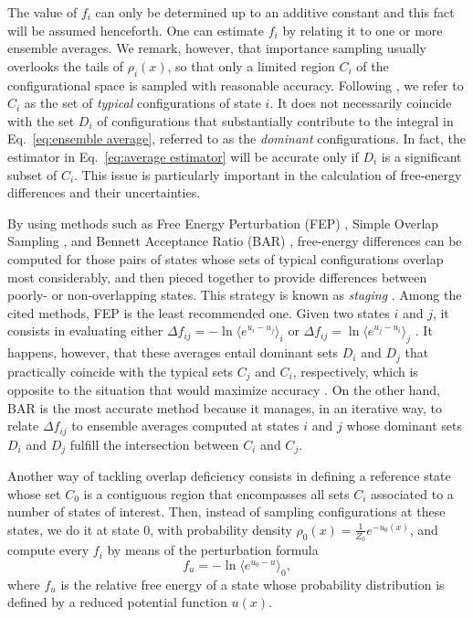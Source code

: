 \documentclass[journal=jctcce,manuscript=article,layout=twocolumn]{achemso}
\begin{document}
The value of $f_i$ can only be determined up to an additive constant and this fact will be assumed henceforth. One can estimate $f_i$ by relating it to one or more ensemble averages. We remark, however, that importance sampling usually overlooks the tails of $\rho_i(x)$, so that only a limited region $C_i$ of the configurational space is sampled with reasonable accuracy. Following \citeauthor{Jarzynski_2006} \cite{Jarzynski_2006}, we refer to $C_i$ as the set of \textit{typical} configurations of state $i$. It does not necessarily coincide with the set $D_i$ of configurations that substantially contribute to the integral in Eq.~\eqref{eq:ensemble average}, referred to as the \textit{dominant} configurations. In fact, the estimator in Eq.~\eqref{eq:average estimator} will be accurate only if $D_i$ is a significant subset of $C_i$. This issue is particularly important in the calculation of free-energy differences and their uncertainties.

By using methods such as Free Energy Perturbation (FEP) \cite{Zwanzig_1954}, Simple Overlap Sampling \cite{Lee_1980, Lu_2003}, and Bennett Acceptance Ratio (BAR) \cite{Bennett_1976}, free-energy differences can be computed for those pairs of states whose sets of typical configurations overlap most considerably, and then pieced together to provide differences between poorly- or non-overlapping states. This strategy is known as \textit{staging} \cite{Kofke_1998}. Among the cited methods, FEP is the least recommended one. Given two states $i$ and $j$, it consists in evaluating either $\Delta f_{ij} = -\ln \langle e^{u_i - u_j} \rangle_i$ or $\Delta f_{ij} = \ln \langle e^{u_j - u_i} \rangle_j$ \cite{Zwanzig_1954}. It happens, however, that these averages entail dominant sets $D_i$ and $D_j$ that practically coincide with the typical sets $C_j$ and $C_i$, respectively, which is opposite to the situation that would maximize accuracy \cite{Jarzynski_2006}. On the other hand, BAR is the most accurate method because it manages, in an iterative way, to relate $\Delta f_{ij}$ to ensemble averages computed at states $i$ and $j$ whose dominant sets $D_i$ and $D_j$ fulfill the intersection between $C_i$ and $C_j$.

Another way of tackling overlap deficiency consists in defining a reference state whose set $C_0$ is a contiguous region that encompasses all sets $C_i$ associated to a number of states of interest. Then, instead of sampling configurations at these states, we do it at state $0$, with probability density $\rho_0(x) = \frac{1}{Z_0} e^{-u_0(x)}$, and compute every $f_i$ by means of the perturbation formula
\begin{equation}
\label{eq:nbs sampling free energy}
f_u = -\ln \langle e^{u_0-u} \rangle_0,
\end{equation}
where $f_u$ is the relative free energy of a state whose probability distribution is defined by a reduced potential function $u(x)$.
\end{document}
